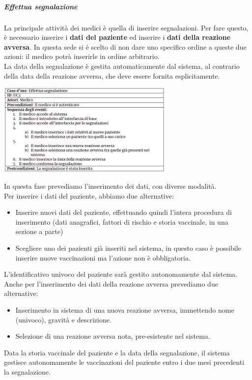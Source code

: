 \documentclass[11pt]{article}
\begin{document}
    \newpage
        \subparagraph*{Effettua segnalazione}
            La principale attività dei medici è quella di inserire segnalazioni. Per fare questo, è necessario
            inserire i \textbf{dati del paziente} ed inserire i \textbf{dati della reazione avversa}. In questa sede si è scelto di non dare uno specifico ordine a queste due azioni: il medico potrà inserirle in ordine arbitrario.\\
            La data della segnalazione è gestita automaticamente dal sistema, al contrario della data della reazione avversa, che deve essere fornita esplicitamente.
                \begin{center}
                    \includegraphics[width=0.65\textwidth]{pictures/UC3.png}
                \end{center}
            In questa fase prevediamo l'inserimento dei dati, con diverse modalità.\\
            Per inserire i dati del paziente, abbiamo due alternative:
                \begin{itemize}
                    \item Inserire nuovi dati del paziente, effettuando quindi l'intera procedura di inserimento (dati anagrafici, fattori di rischio e storia vaccinale, in una sezione a parte)
                    \item Scegliere uno dei pazienti già inseriti nel sistema, in questo caso è possibile inserire nuove vaccinazioni ma l'azione non è obbligatoria.
                \end{itemize}
            L'identificativo univoco del paziente sarà gestito autonomamente dal sistema.\\
            Anche per l'inserimento dei dati della reazione avversa prevediamo due alternative:
                \begin{itemize}
                    \item Inserimento in sistema di una nuova reazione avversa, immettendo nome (univoco), gravità e descrizione.
                    \item Selezione di una reazione avversa nota, pre-esistente nel sistema.
                \end{itemize}
            Data la storia vaccinale del paziente e la data della segnalazione, il sistema gestisce autonomamente
            le vaccinazioni del paziente entro i due mesi precedenti la segnalazione.
\end{document}
